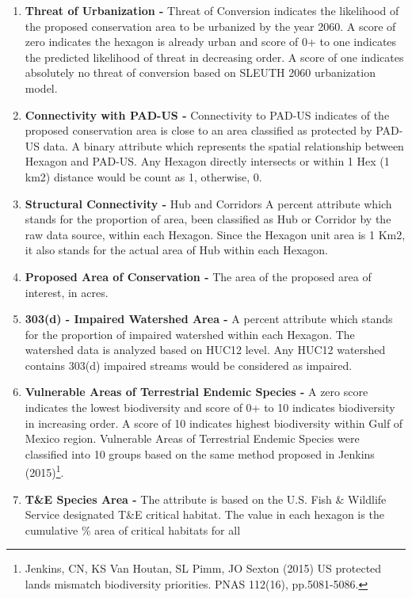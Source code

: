 \documentclass[]{article}
\providecommand{\tightlist}{%
  \setlength{\itemsep}{0pt}\setlength{\parskip}{0pt}}
\let\rmarkdownfootnote\footnote%
\def\footnote{\protect\rmarkdownfootnote}
\begin{document}
\begin{enumerate}
\def\labelenumi{\arabic{enumi}.}
\tightlist
\item
  \textbf{Threat of Urbanization -} Threat of Conversion indicates the
  likelihood of the proposed conservation area to be urbanized by the
  year 2060. A score of zero indicates the hexagon is already urban and
  score of 0+ to one indicates the predicted likelihood of threat in
  decreasing order. A score of one indicates absolutely no threat of
  conversion based on SLEUTH 2060 urbanization model.
\item
  \textbf{Connectivity with PAD-US -} Connectivity to PAD-US indicates
  of the proposed conservation area is close to an area classified as
  protected by PAD-US data. A binary attribute which represents the
  spatial relationship between Hexagon and PAD-US. Any Hexagon directly
  intersects or within 1 Hex (1 km2) distance would be count as 1,
  otherwise, 0.
\item
  \textbf{Structural Connectivity -} Hub and Corridors A percent
  attribute which stands for the proportion of area, been classified as
  Hub or Corridor by the raw data source, within each Hexagon. Since the
  Hexagon unit area is 1 Km2, it also stands for the actual area of Hub
  within each Hexagon.
\item
  \textbf{Proposed Area of Conservation -} The area of the proposed area
  of interest, in acres.
\item
  \textbf{303(d) - Impaired Watershed Area -} A percent attribute which
  stands for the proportion of impaired watershed within each Hexagon.
  The watershed data is analyzed based on HUC12 level. Any HUC12
  watershed contains 303(d) impaired streams would be considered as
  impaired.
\item
  \textbf{Vulnerable Areas of Terrestrial Endemic Species -} A zero score 
  indicates the lowest biodiversity and score of 0+ to 10 indicates 
  biodiversity in increasing order. A score of 10 indicates highest 
  biodiversity within Gulf of Mexico region. Vulnerable Areas of Terrestrial 
  Endemic Species were classified into 10 groups based on the same method 
  proposed in Jenkins (2015)\footnote{Jenkins,
    CN, KS Van Houtan, SL Pimm, JO Sexton (2015) US protected lands
    mismatch biodiversity priorities. PNAS 112(16), pp.5081-5086.}.
\item
  \textbf{T\&E Species Area -} The attribute is based on the U.S. Fish
  \& Wildlife Service designated T\&E critical habitat. The value in
  each hexagon is the cumulative \% area of critical habitats for all

\end{enumerate}
\end{document}
